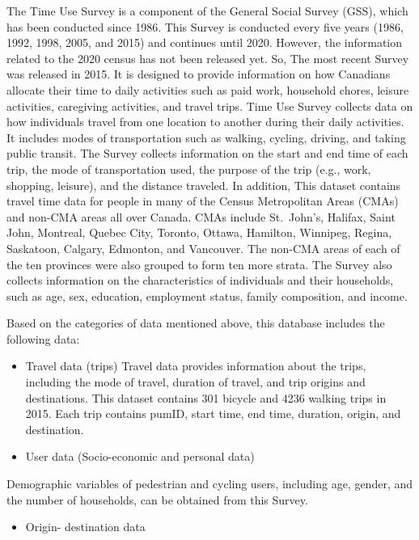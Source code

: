 \documentclass[
11pt, %
oneside, %
english, %
singlespacing, %
]{macthesis} %
\def\tightlist{}
\begin{document}
The Time Use Survey is a component of the General Social Survey (GSS), which has been conducted since 1986. This Survey is conducted every five years (1986, 1992, 1998, 2005, and 2015) and continues until 2020. However, the information related to the 2020 census has not been released yet. So, The most recent Survey was released in 2015. It is designed to provide information on how Canadians allocate their time to daily activities such as paid work, household chores, leisure activities, caregiving activities, and travel trips. Time Use Survey collects data on how individuals travel from one location to another during their daily activities. It includes modes of transportation such as walking, cycling, driving, and taking public transit. The Survey collects information on the start and end time of each trip, the mode of transportation used, the purpose of the trip (e.g., work, shopping, leisure), and the distance traveled. In addition, This dataset contains travel time data for people in many of the Census Metropolitan Areas (CMAs) and non-CMA areas all over Canada. CMAs include St.~John's, Halifax, Saint John, Montreal, Quebec City, Toronto, Ottawa, Hamilton, Winnipeg, Regina, Saskatoon, Calgary, Edmonton, and Vancouver. The non-CMA areas of each of the ten provinces were also grouped to form ten more strata. The Survey also collects information on the characteristics of individuals and their households, such as age, sex, education, employment status, family composition, and income.

Based on the categories of data mentioned above, this database includes the following data:

\begin{itemize}
\item
  Travel data (trips) Travel data provides information about the trips, including the mode of travel, duration of travel, and trip origins and destinations. This dataset contains 301 bicycle and 4236 walking trips in 2015. Each trip contains pumID, start time, end time, duration, origin, and destination.
\item
  User data (Socio-economic and personal data)
\end{itemize}

Demographic variables of pedestrian and cycling users, including age, gender, and the number of households, can be obtained from this Survey.

\begin{itemize}
\tightlist
\item
  Origin- destination data
\end{itemize}
\end{document}
